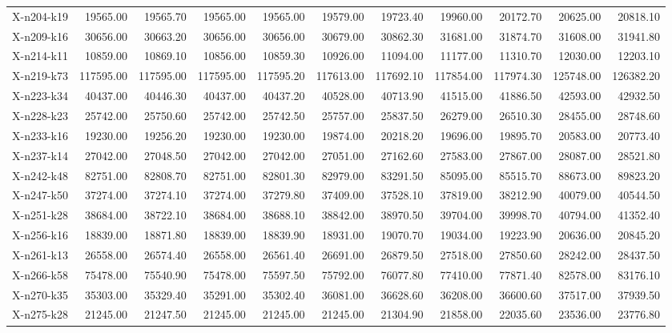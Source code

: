 \documentclass[letterpaper]{article} %
\begin{document}
\begin{longtable}{@{}l rr rr rr rr rr@{}}
X-n204-k19 & 19565.00 & 19565.70 & 19565.00 & 19565.00 & 19579.00 & 19723.40 & 19960.00 & 20172.70 & 20625.00 & 20818.10 \\
X-n209-k16 & 30656.00 & 30663.20 & 30656.00 & 30656.00 & 30679.00 & 30862.30 & 31681.00 & 31874.70 & 31608.00 & 31941.80 \\
X-n214-k11 & 10859.00 & 10869.10 & 10856.00 & 10859.30 & 10926.00 & 11094.00 & 11177.00 & 11310.70 & 12030.00 & 12203.10 \\
X-n219-k73 & 117595.00 & 117595.00 & 117595.00 & 117595.20 & 117613.00 & 117692.10 & 117854.00 & 117974.30 & 125748.00 & 126382.20 \\
X-n223-k34 & 40437.00 & 40446.30 & 40437.00 & 40437.20 & 40528.00 & 40713.90 & 41515.00 & 41886.50 & 42593.00 & 42932.50 \\
X-n228-k23 & 25742.00 & 25750.60 & 25742.00 & 25742.50 & 25757.00 & 25837.50 & 26279.00 & 26510.30 & 28455.00 & 28748.60 \\
X-n233-k16 & 19230.00 & 19256.20 & 19230.00 & 19230.00 & 19874.00 & 20218.20 & 19696.00 & 19895.70 & 20583.00 & 20773.40 \\
X-n237-k14 & 27042.00 & 27048.50 & 27042.00 & 27042.00 & 27051.00 & 27162.60 & 27583.00 & 27867.00 & 28087.00 & 28521.80 \\
X-n242-k48 & 82751.00 & 82808.70 & 82751.00 & 82801.30 & 82979.00 & 83291.50 & 85095.00 & 85515.70 & 88673.00 & 89823.20 \\
X-n247-k50 & 37274.00 & 37274.10 & 37274.00 & 37279.80 & 37409.00 & 37528.10 & 37819.00 & 38212.90 & 40079.00 & 40544.50 \\
X-n251-k28 & 38684.00 & 38722.10 & 38684.00 & 38688.10 & 38842.00 & 38970.50 & 39704.00 & 39998.70 & 40794.00 & 41352.40 \\
X-n256-k16 & 18839.00 & 18871.80 & 18839.00 & 18839.90 & 18931.00 & 19070.70 & 19034.00 & 19223.90 & 20636.00 & 20845.20 \\
X-n261-k13 & 26558.00 & 26574.40 & 26558.00 & 26561.40 & 26691.00 & 26879.50 & 27518.00 & 27850.60 & 28242.00 & 28437.50 \\
X-n266-k58 & 75478.00 & 75540.90 & 75478.00 & 75597.50 & 75792.00 & 76077.80 & 77410.00 & 77871.40 & 82578.00 & 83176.10 \\
X-n270-k35 & 35303.00 & 35329.40 & 35291.00 & 35302.40 & 36081.00 & 36628.60 & 36208.00 & 36600.60 & 37517.00 & 37939.50 \\
X-n275-k28 & 21245.00 & 21247.50 & 21245.00 & 21245.00 & 21245.00 & 21304.90 & 21858.00 & 22035.60 & 23536.00 & 23776.80 \\

\end{longtable}
\end{document}
